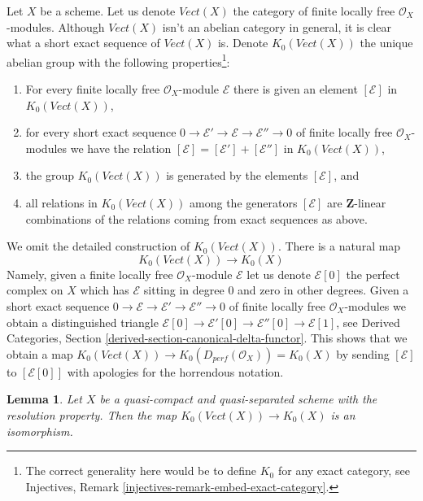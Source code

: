 \documentclass{stacks-project}
\theoremstyle{plain}
\newtheorem{lemma}[subsection]{Lemma}
\theoremstyle{definition}
\theoremstyle{remark}
\numberwithin{equation}{subsection}
\begin{document}
\noindent
Let $X$ be a scheme. Let us denote $\textit{Vect}(X)$ the category
of finite locally free $\mathcal{O}_X$-modules. Although
$\textit{Vect}(X)$ isn't an abelian category in general, it
is clear what a short exact sequence of $\textit{Vect}(X)$ is.
Denote $K_0(\textit{Vect}(X))$ the unique abelian group with the
following properties\footnote{The correct generality here
would be to define $K_0$ for any exact category, see
Injectives, Remark \ref{injectives-remark-embed-exact-category}.}:
\begin{enumerate}
\item For every finite locally free $\mathcal{O}_X$-module $\mathcal{E}$ there
is given an element $[\mathcal{E}]$ in $K_0(\textit{Vect}(X))$,
\item for every short exact sequence
$0 \to \mathcal{E}' \to \mathcal{E} \to \mathcal{E}'' \to 0$
of finite locally free $\mathcal{O}_X$-modules we have the relation
$[\mathcal{E}] = [\mathcal{E}'] + [\mathcal{E}'']$ in $K_0(\textit{Vect}(X))$,
\item the group $K_0(\textit{Vect}(X))$ is generated by the elements
$[\mathcal{E}]$, and
\item all relations in $K_0(\textit{Vect}(X))$ among the generators
$[\mathcal{E}]$ are $\mathbf{Z}$-linear combinations
of the relations coming from exact sequences as above.
\end{enumerate}
We omit the detailed construction of $K_0(\textit{Vect}(X))$.
There is a natural map
$$
K_0(\textit{Vect}(X)) \longrightarrow K_0(X)
$$
Namely, given a finite locally free $\mathcal{O}_X$-module $\mathcal{E}$
let us denote $\mathcal{E}[0]$ the perfect complex on $X$ which has
$\mathcal{E}$ sitting in degree $0$ and zero in other degrees.
Given a short exact sequence
$0 \to \mathcal{E} \to \mathcal{E}' \to \mathcal{E}'' \to 0$ of finite
locally free $\mathcal{O}_X$-modules we obtain a distinguished triangle
$\mathcal{E}[0] \to \mathcal{E}'[0] \to \mathcal{E}''[0] \to \mathcal{E}[1]$,
see Derived Categories, Section \ref{derived-section-canonical-delta-functor}.
This shows that we obtain a map
$K_0(\textit{Vect}(X)) \to K_0(D_{perf}(\mathcal{O}_X)) = K_0(X)$
by sending $[\mathcal{E}]$ to $[\mathcal{E}[0]]$
with apologies for the horrendous notation.

\begin{lemma}
\label{lemma-K-is-old-K}
Let $X$ be a quasi-compact and quasi-separated scheme with the
resolution property. Then the map $K_0(\textit{Vect}(X)) \to K_0(X)$
is an isomorphism.
\end{lemma}
\end{document}
